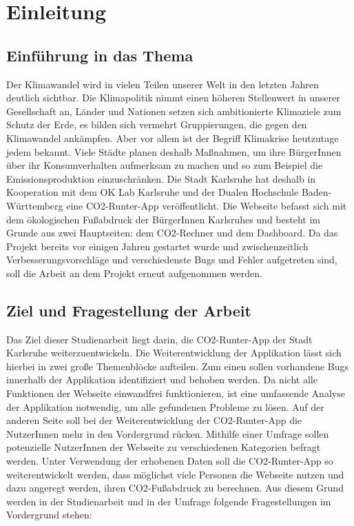 
\chapter{Einleitung}
\label{chapter:1}

\section{Einführung in das Thema}

Der Klimawandel wird in vielen Teilen unserer Welt in den letzten Jahren deutlich sichtbar.
Die Klimapolitik nimmt einen höheren Stellenwert in unserer Gesellschaft an, Länder und Nationen setzen sich ambitionierte Klimaziele zum Schutz der Erde, es bilden sich vermehrt Gruppierungen, die gegen den Klimawandel ankämpfen. Aber vor allem ist der Begriff Klimakrise heutzutage jedem bekannt. Viele Städte planen deshalb Maßnahmen, um ihre BürgerInnen über ihr Konsumverhalten aufmerksam zu machen und so zum Beispiel die Emissionsproduktion einzuschränken. Die Stadt Karlsruhe hat deshalb in Kooperation mit dem OK Lab Karlsruhe und der Dualen Hochschule Baden-Württemberg eine CO2-Runter-App veröffentlicht. Die Webseite befasst sich mit dem ökologischen Fußabdruck der BürgerInnen Karlsruhes und besteht im Grunde aus zwei Hauptseiten: dem CO2-Rechner und dem Dashboard. Da das Projekt bereits vor einigen Jahren gestartet wurde und zwischenzeitlich Verbesserungsvorschläge und verschiedenste Bugs und Fehler aufgetreten sind, soll die Arbeit an dem Projekt erneut aufgenommen werden.

\section{Ziel und Fragestellung der Arbeit}

Das Ziel dieser Studienarbeit liegt darin, die CO2-Runter-App der Stadt Karlsruhe weiterzuentwickeln. Die Weiterentwicklung der Applikation lässt sich hierbei in zwei große Themenblöcke aufteilen. Zum einen sollen vorhandene Bugs innerhalb der Applikation identifiziert und behoben werden. Da nicht alle Funktionen der Webseite einwandfrei funktionieren, ist eine umfassende Analyse der Applikation notwendig, um alle gefundenen Probleme zu lösen. Auf der anderen Seite soll bei der Weiterentwicklung der CO2-Runter-App die NutzerInnen mehr in den Vordergrund rücken. Mithilfe einer Umfrage sollen potenzielle NutzerInnen der Webseite zu verschiedenen Kategorien befragt werden. Unter Verwendung der erhobenen Daten soll die CO2-Runter-App so weiterentwickelt werden, dass möglichst viele Personen die Webseite nutzen und dazu angeregt werden, ihren CO2-Fußabdruck zu berechnen. Aus diesem Grund werden in der Studienarbeit und in der Umfrage folgende Fragestellungen im Vordergrund stehen:


